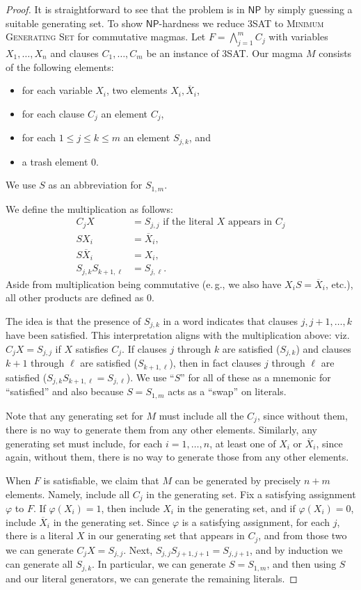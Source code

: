 \documentclass{theoretics}
\newcommand{\algprobm}[1]{\textsc{#1}\xspace}
\newcommand*{\ComplexityClass}[1]{\ensuremath{\mathsf{#1}}\xspace}
\newcommand*{\NP}{\ComplexityClass{NP}}
\begin{document}
\begin{proof}
It is straightforward to see that the problem is in \NP by simply guessing a suitable generating set. To show \NP-hardness
we reduce \algprobm{3SAT} to \algprobm{Minimum Generating Set} for commutative magmas. Let $F=\bigwedge_{j=1}^m C_j$ 
with variables $X_1, \dots, X_n$ and clauses $C_1, \dots, C_m$ be an instance of \algprobm{3SAT}. Our magma $M$ consists of the following elements: 
\begin{itemize}
\item for each variable $X_i$, two elements $X_i, \overline{X}_i$, 
\item for each clause $C_j$ an element $C_j$,
\item for each $1\leq j\leq k\leq m$ an element $S_{j,k}$, and 
\item a trash element $0$.
\end{itemize}
We use $S$ as an abbreviation for $S_{1,m}$. 

We define the multiplication as follows: 
\begin{align*}   
 C_j X &= S_{j,j} \text{ if the literal $X$ appears in $C_j$}\\
 S  X_i &= \overline{X}_i,\\ 
 S \overline{X}_i &= X_i, \\
  S_{j,k}S_{k+1,\ell}&= S_{j,\ell}.
\end{align*}
Aside from multiplication being commutative (e.\,g., we also have $X_i S = \overline{X}_i$, etc.), 
all other products are defined as $0$.

The idea is that the presence of $S_{j,k}$ in a word indicates that clauses $j,j+1,\dotsc,k$ have been satisfied. This interpretation aligns with the multiplication above: viz. $C_j X = S_{j,j}$ if $X$ satisfies $C_j$. If clauses $j$ through $k$ are satisfied ($S_{j,k}$) and clauses $k+1$ through $\ell$ are satisfied ($S_{k+1,\ell}$), then in fact clauses $j$ through $\ell$ are satisfied ($S_{j,k} S_{k+1,\ell} = S_{j,\ell}$). We use ``$S$'' for all of these as a mnemonic for ``satisfied'' and also because $S = S_{1,m}$ acts as a ``swap'' on literals.

Note that any generating set for $M$ must include all the $C_j$, since without them, there is no way to generate them from any other elements. Similarly, any generating set must include, for each $i=1,\dotsc,n$, at least one of $X_i$ or $\overline{X}_i$, since again, without them, there is no way to generate those from any other elements.

When $F$ is satisfiable, we claim that $M$ can be generated by precisely $n+m$ elements. Namely, include all $C_j$ in the generating set. Fix a satisfying assignment $\varphi$ to $F$. If $\varphi(X_i)=1$, then include $X_i$ in the generating set, and if $\varphi(X_i)=0$, include $\overline{X}_i$ in the generating set. Since $\varphi$ is a satisfying assignment, for each $j$, there is a literal $X$ in our generating set that appears in $C_j$, and from those two we can generate $C_j X = S_{j,j}$. Next, $S_{j,j} S_{j+1,j+1} = S_{j,j+1}$, and by induction we can generate all $S_{j,k}$. In particular, we can generate $S=S_{1,m}$, and then using $S$ and our literal generators, we can generate the remaining literals.


\end{proof}
\end{document}

